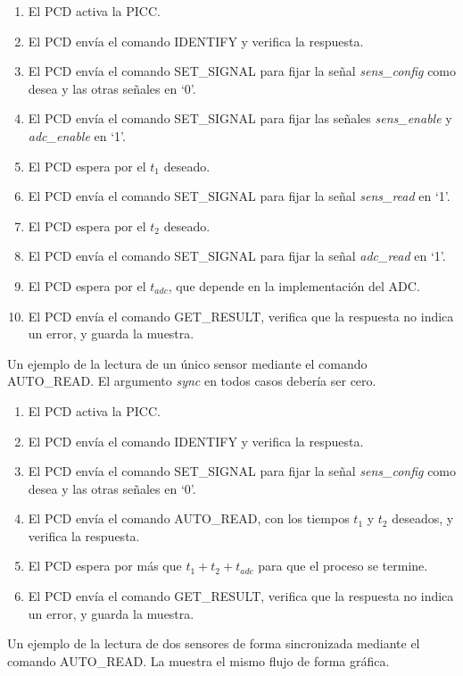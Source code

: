 \documentclass[a4paper, twoside, 11pt]{report}
\begin{document}
\begin{enumerate}
  \item El PCD activa la PICC.
  \item El PCD envía el comando IDENTIFY y verifica la respuesta.
  \item El PCD envía el comando SET\_SIGNAL para fijar la señal \textit{sens\_config} como desea y las otras señales en ‘0’.
  \item El PCD envía el comando SET\_SIGNAL para fijar las señales \textit{sens\_enable} y \textit{adc\_enable} en ‘1’.
  \item El PCD espera por el $t_1$ deseado.
  \item El PCD envía el comando SET\_SIGNAL para fijar la señal \textit{sens\_read} en ‘1’.
  \item El PCD espera por el $t_2$ deseado.
  \item El PCD envía el comando SET\_SIGNAL para fijar la señal \textit{adc\_read} en ‘1’.
  \item El PCD espera por el $t_{adc}$, que depende en la implementación del ADC.
  \item El PCD envía el comando GET\_RESULT, verifica que la respuesta no indica un error, y guarda la muestra.
\end{enumerate}

Un ejemplo de la lectura de un único sensor mediante el comando AUTO\_READ. El argumento \textit{sync} en todos casos debería ser cero.

\begin{enumerate}
  \item El PCD activa la PICC.
  \item El PCD envía el comando IDENTIFY y verifica la respuesta.
  \item El PCD envía el comando SET\_SIGNAL para fijar la señal \textit{sens\_config} como desea y las otras señales en ‘0’.
  \item El PCD envía el comando AUTO\_READ, con los tiempos $t_1$ y $t_2$ deseados, y verifica la respuesta.
  \item El PCD espera por más que $t_1 + t_2 + t_{adc}$ para que el proceso se termine.
  \item El PCD envía el comando GET\_RESULT, verifica que la respuesta no indica un error, y guarda la muestra.
\end{enumerate}

Un ejemplo de la lectura de dos sensores de forma sincronizada mediante el comando AUTO\_READ. La  muestra el mismo flujo de forma gráfica.
\end{document}
